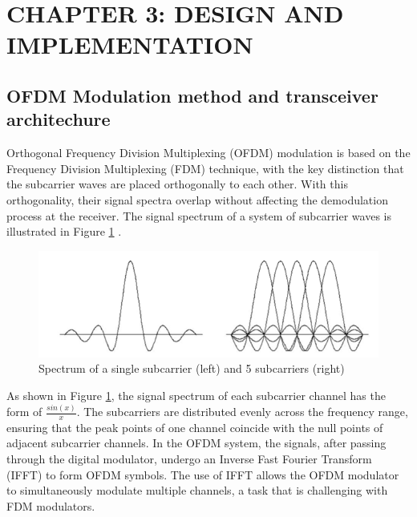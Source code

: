\section*{CHAPTER 3:  DESIGN AND IMPLEMENTATION}
\setcounter{section}{3}
\setcounter{subsection}{0}
\setcounter{figure}{0}
\setcounter{table}{0}

\subsection{OFDM Modulation method and transceiver architechure}
Orthogonal Frequency Division Multiplexing (OFDM) modulation is based on the Frequency Division Multiplexing (FDM) technique, with the key distinction that the subcarrier waves are placed orthogonally to each other. With this orthogonality, their signal spectra overlap without affecting the demodulation process at the receiver. The signal spectrum of a system of subcarrier waves is illustrated in Figure \ref{Spectrum} \cite{b6}.

\begin{figure}[htbp]
    \centering
    \includegraphics[width=\textwidth]{Figures/Spectrum.png}
    \caption{Spectrum of a single subcarrier (left) and 5 subcarriers (right)}
    \label{Spectrum}    
\end{figure}

As shown in Figure \ref{Spectrum}, the signal spectrum of each subcarrier channel has the form of $\frac{sin(x)}{x}$. The subcarriers are distributed evenly across the frequency range, ensuring that the peak points of one channel coincide with the null points of adjacent subcarrier channels. In the OFDM system, the signals, after passing through the digital modulator, undergo an Inverse Fast Fourier Transform (IFFT) to form OFDM symbols. The use of IFFT allows the OFDM modulator to simultaneously modulate multiple channels, a task that is challenging with FDM modulators.

